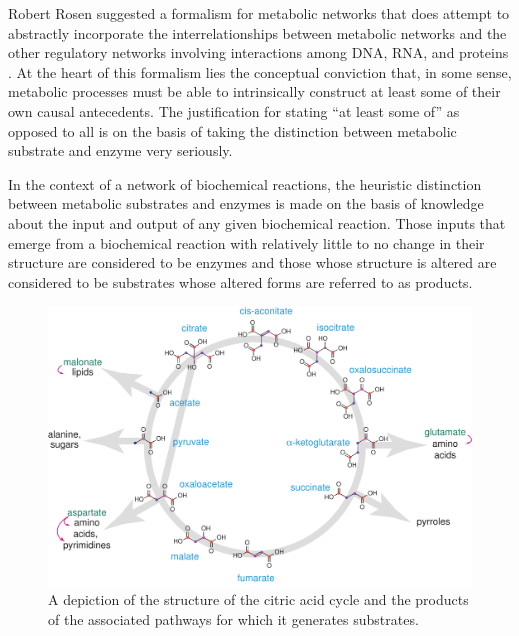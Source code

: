Robert Rosen suggested a formalism for metabolic networks that does attempt to abstractly incorporate the interrelationships between metabolic networks and the other regulatory networks involving interactions among DNA, RNA, and proteins \cite{Rosen1972,Rosen1991}. At the heart of this formalism lies the conceptual conviction that, in some sense, metabolic processes must be able to intrinsically construct at least some of their own causal antecedents. The justification for stating ``at least some of'' as opposed to all is on the basis of taking the distinction between metabolic substrate and enzyme very seriously.

In the context of a network of biochemical reactions, the heuristic distinction between metabolic substrates and enzymes is made on the basis of knowledge about the input and output of any given biochemical reaction. Those inputs that emerge from a biochemical reaction with relatively little to no change in their structure are considered to be enzymes and those whose structure is altered are considered to be substrates whose altered forms are referred to as products. 

\begin{figure}
\begin{center}
\noindent\includegraphics[width=0.7\columnwidth]{fig/rTCA_skeleton.pdf}
\end{center}
\caption{A depiction of the structure of the citric acid cycle and the products of the associated pathways for which it generates substrates.}
\label{fig:ctacyc}
\end{figure}

